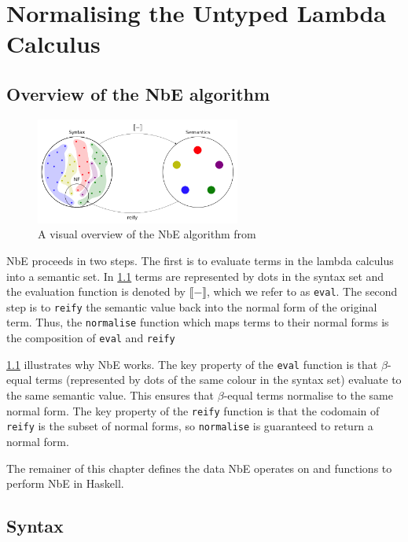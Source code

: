 \chapter{Normalising the Untyped Lambda Calculus}
\label{chap:untypednbe}

\section{Overview of the NbE algorithm}

\begin{figure}[h]
    \centering
    \includegraphics[width=0.6\textwidth]{./images/nbe_diagram}
    \caption{A visual overview of the NbE algorithm from \cite{slides}}
    \label{fig:nbeOverview}
\end{figure}

NbE proceeds in two steps. The first is to evaluate terms in the lambda calculus into a semantic set. In \ref{fig:nbeOverview} terms are represented by dots in the syntax set and the evaluation function is denoted by $\llbracket - \rrbracket$, which we refer to as \lstinline{eval}. The second step is to \lstinline{reify} the semantic value back into the normal form of the original term. Thus, the \lstinline{normalise} function which maps terms to their normal forms is the composition of \lstinline{eval} and \lstinline{reify}

\ref{fig:nbeOverview} illustrates why NbE works. The key property of the \lstinline{eval} function is that $\beta$-equal terms (represented by dots of the same colour in the syntax set) evaluate to the same semantic value. This ensures that $\beta$-equal terms normalise to the same normal form. The key property of the \lstinline{reify} function is that the codomain of \lstinline{reify} is the subset of normal forms, so \lstinline{normalise} is guaranteed to return a normal form. 

The remainer of this chapter defines the data NbE operates on and functions to perform NbE in Haskell.

\section{Syntax}

